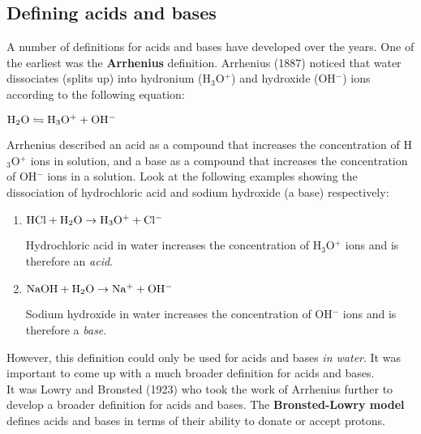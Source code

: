 \subsection{Defining acids and bases}

A number of definitions for acids and bases have developed over the years. One of the earliest was the \textbf{Arrhenius} definition. Arrhenius (1887) noticed that water dissociates (splits up) into hydronium (H$_{3}$O$^{+}$) and hydroxide (OH$^{-}$) ions according to the following equation:

\begin{center}
$\rm{H_{2}O \leftrightharpoons H_{3}O^{+} + OH^{-}}$
\end{center}


Arrhenius described an acid as a compound that increases the concentration of H$_{3}$O$^{+}$ ions in solution, and a base as a compound that increases the concentration of OH$^{-}$ ions in a solution. Look at the following examples showing the dissociation of hydrochloric acid and sodium hydroxide (a base) respectively:

\begin{enumerate}
\item{
$\rm{HCl + H_{2}O \rightarrow H_{3}O^{+} + Cl^{-}}$

Hydrochloric acid in water increases the concentration of H$_{3}$O$^{+}$ ions and is therefore an \textit{acid}.}

\item{$\rm{NaOH + H_{2}O \rightarrow Na^{+} + OH^{-}}$

Sodium hydroxide in water increases the concentration of OH$^{-}$ ions and is therefore a \textit{base}.} 
\end{enumerate}

However, this definition could only be used for acids and bases \textit{in water}. It was important to come up with a much broader definition for acids and bases. \\ 

It was Lowry and Bronsted (1923) who took the work of Arrhenius further to develop a broader definition for acids and bases. The \textbf{Bronsted-Lowry model} defines acids and bases in terms of their ability to donate or accept protons.


